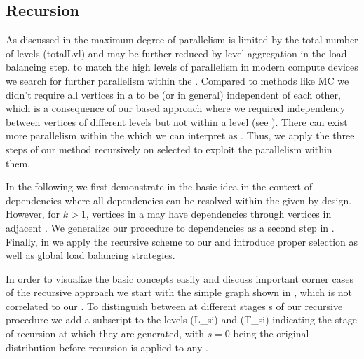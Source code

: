 	\subsection{Recursion}\label{subsec:REC}
As discussed in  the maximum degree of parallelism is limited
by the total number of levels (\acrshort{totalLvl}) and may be further reduced 
by level aggregation in the load balancing step.  to match the high levels of parallelism in modern compute devices we search for 
further parallelism within the \levelGroups.  Compared to methods like \acrshort{MC} 
we didn't require all vertices in a \levelGroup to be \DONE (or \DK in general) 
independent of each other, which is a consequence of our \level based approach 
where we required \DK independency between vertices of different levels but not 
within a level (see ). There can exist more parallelism within 
the \levelGroups which we can interpret as \subgraphs.  Thus, we apply the three 
steps of our method recursively on selected \subgraphs to exploit the parallelism 
within them.  

In the following we first demonstrate in  the basic idea in the context of \DONE dependencies where all dependencies can be resolved within the given \levelGroup by design. However, for $k>1$, vertices in a \levelGroup may have \DK dependencies through vertices in adjacent \levelGroups. We generalize our procedure to \DK dependencies as a second step in . Finally, in  we apply the recursive scheme to our \stex and introduce proper \subgraph selection as well as global load balancing strategies. 

In order to visualize the basic concepts easily and discuss important corner cases of the recursive approach we start with the simple graph shown in , which is not correlated to our \stex. To distinguish between \levelGroups at different stages \acrshort{s} of our recursive procedure we add a subscript to the levels (\acrshort{L_si}) and \levelGroups (\acrshort{T_si}) indicating the stage of recursion at which they are generated, with $s=0$ being the original distribution before recursion is applied to any \subgraph. 

